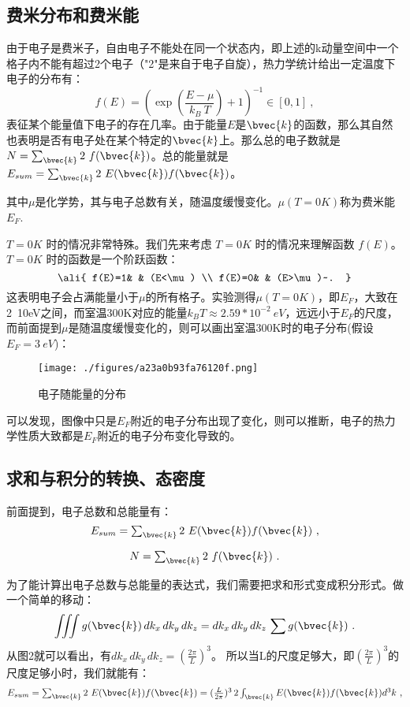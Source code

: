 \subsection{费米分布和费米能}
由于电子是费米子，自由电子不能处在同一个状态内，即上述的k动量空间中一个格子内不能有超过2个电子（"2"是来自于电子自旋），热力学统计给出一定温度下电子的分布有：
\begin{equation}
f(E)=\left (\exp(\frac{E-\mu}{k_B\ T})+1\right )^{-1}    \in[0,1]~,
\end{equation}
表征某个能量值下电子的存在几率。由于能量$E$是$\bvec{k}$的函数，那么其自然也表明是否有电子处在某个特定的$\bvec{k}$上。那么总的电子数就是$N=\textstyle \sum_{\bvec{k}}2\ f(\bvec{k})$。总的能量就是$E_{sum}=\textstyle \sum_{\bvec{k}}2\ E(\bvec{k})f(\bvec{k})$。

其中$\mu$是化学势，其与电子总数有关，随温度缓慢变化。$\mu (T=0K)$称为费米能$E_F$.

$T=0K$ 时的情况非常特殊。我们先来考虑 $T=0K$ 时的情况来理解函数 $f(E)$。$T=0K$ 时的函数是一个阶跃函数：
\begin{equation}\ali{
f(E)=1& & (E<\mu) \\
f(E)=0& & (E>\mu)~.
}\end{equation}
这表明电子会占满能量小于$\mu$的所有格子。实验测得$\mu(T=0K)$，即$E_F$，大致在2~10eV之间，而室温300K对应的能量$k_BT\approx2.59*10^{-2}\ eV$，远远小于$E_F$的尺度，而前面提到$\mu$是随温度缓慢变化的，则可以画出室温300K时的电子分布(假设$E_F=3\ eV$)：
\begin{figure}[ht]
\centering
\texttt{[image: ./figures/a23a0b93fa76120f.png]}
\caption{电子随能量的分布} \label{fig_SMFM_3}
\end{figure}
可以发现，图像中只是$E_F$附近的电子分布出现了变化，则可以推断，电子的热力学性质大致都是$E_F$附近的电子分布变化导致的。

\subsection{求和与积分的转换、态密度}
前面提到，电子总数和总能量有：
\begin{equation}
E_{sum}=\textstyle \sum_{\bvec{k}}2\ E(\bvec{k})f(\bvec{k})~,
\end{equation}

\begin{equation}
N=\textstyle \sum_{\bvec{k}}2\ f(\bvec{k})~.
\end{equation}

为了能计算出电子总数与总能量的表达式，我们需要把求和形式变成积分形式。做一个简单的移动：
\begin{equation}
\iiint g(\bvec{k})\,dk_x\,dk_y\,dk_z=dk_x\,dk_y\,dk_z\,\sum g(\bvec{k})~.
\end{equation}
从图2就可以看出，有$dk_x\,dk_y\,dk_z=(\frac{2\pi}{L})^3$。
所以当L的尺度足够大，即$(\frac{2\pi}{L})^3$的尺度足够小时，我们就能有：
\begin{equation}
E_{sum}=\textstyle \sum_{\bvec{k}}2\ E(\bvec{k})f(\bvec{k})=(\frac{L}{2\pi})^3\,2 \int_{\bvec{k}}E(\bvec{k})f(\bvec{k})d^3k~,
\end{equation}

